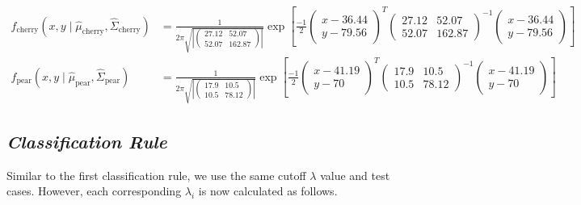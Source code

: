 \documentclass[]{article}
\begin{document}
\begin{align*}
f_{\text{cherry}}(x,y \mid \hat{\mu}_{\text{cherry}}, \hat{\Sigma}_{\text{cherry}}) &= 
\frac{1}{2\pi\sqrt{\left| \left( \begin{matrix}27.12 &52.07 \\ 52.07  & 162.87\end{matrix}\right) \right|}} 
\exp\left[\frac{-1}{2} 
\left(\begin{matrix}
x-36.44 \\ 
y-79.56
\end{matrix}\right)^T 
\left( \begin{matrix}27.12 &52.07 \\ 52.07  & 162.87\end{matrix}\right) ^{-1} 
\left(\begin{matrix}
x-36.44 \\ 
y-79.56 
\end{matrix}\right) \right] \\
f_{\text{pear}}(x,y \mid \hat{\mu}_{\text{pear}}, \hat{\Sigma}_{\text{pear}}) &= 
\frac{1}{2\pi\sqrt{\left| \left( \begin{matrix}17.9 &10.5 \\ 10.5  & 78.12\end{matrix}\right) \right|}} 
\exp\left[\frac{-1}{2} 
\left(\begin{matrix}
x-41.19 \\ 
y-70
\end{matrix}\right)^T 
\left( \begin{matrix}17.9 &10.5 \\ 10.5  & 78.12\end{matrix}\right) ^{-1} 
\left(\begin{matrix}
x-41.19 \\ 
y-70 
\end{matrix}\right) \right]
\end{align*}

\subsection{\normalsize{\textit{Classification Rule}}}

Similar to the first classification rule, we use the same cutoff
\(\lambda\) value and test cases. However, each corresponding
\(\lambda_i\) is now calculated as follows.
\end{document}
